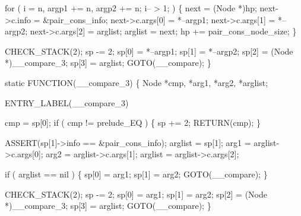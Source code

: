     for ( i = n, argp1 += n, argp2 += n; i-- > 1; )
    \{
        next            = (Node *)hp;
        next->c.info    = &pair_cons_info;
        next->c.args[0] = *--argp1;
        next->c.args[1] = *--argp2;
        next->c.args[2] = arglist;
        arglist         = next;
        hp             += pair_cons_node_size;
    \}

    CHECK_STACK(2);
    sp   -= 2;
    sp[0] = *--argp1;
    sp[1] = *--argp2;
    sp[2] = (Node *)__compare_3;
    sp[3] = arglist;
    GOTO(__compare);
\}

static
FUNCTION(__compare_3)
\{
    Node *cmp, *arg1, *arg2, *arglist;

 ENTRY_LABEL(__compare_3)

    cmp = sp[0];
    if ( cmp != prelude_EQ )
    \{
        sp += 2;
        RETURN(cmp);
    \}

    ASSERT(sp[1]->info == &pair_cons_info);
    arglist = sp[1];
    arg1    = arglist->c.args[0];
    arg2    = arglist->c.args[1];
    arglist = arglist->c.args[2];

    if ( arglist == nil )
    \{
        sp[0] = arg1;
        sp[1] = arg2;
        GOTO(__compare);
    \}

    CHECK_STACK(2);
    sp   -= 2;
    sp[0] = arg1;
    sp[1] = arg2;
    sp[2] = (Node *)__compare_3;
    sp[3] = arglist;
    GOTO(__compare);
\}
\nwendcode{}

%

